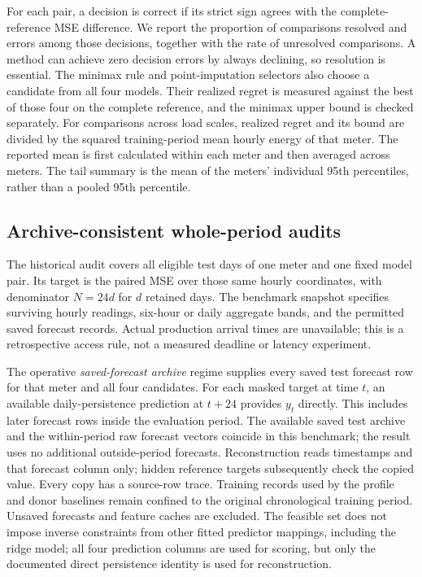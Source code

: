 \documentclass[12pt]{article}
\begin{document}
For each pair, a decision is correct if its strict sign agrees with the
complete-reference MSE difference. We report the proportion of comparisons
resolved and errors among those decisions, together with the rate of
unresolved comparisons. A method can achieve zero decision errors by
always declining, so resolution is essential. The minimax rule and
point-imputation selectors also choose a candidate from all four models.
Their realized regret is measured against the best of those four on the
complete reference, and the minimax upper bound is checked separately.
For comparisons across load scales, realized regret and its bound are
divided by the squared training-period mean hourly energy of that meter.
The reported mean is first calculated within each meter and then averaged
across meters. The tail summary is the mean of the meters' individual
95th percentiles, rather than a pooled 95th percentile.

\subsection{Archive-consistent whole-period audits}\label{sec:period-information}
The historical audit covers all eligible test days of one meter and one
fixed model pair. Its target is the paired MSE over those same hourly
coordinates, with denominator $N=24d$ for $d$ retained days. The benchmark
snapshot specifies surviving hourly readings, six-hour or daily aggregate
bands, and the permitted saved forecast records. Actual production arrival
times are unavailable; this is a retrospective access rule, not a measured
deadline or latency experiment.

The operative \emph{saved-forecast archive} regime supplies every saved
test forecast row for that meter and all four candidates. For each masked
target at time $t$, an available daily-persistence prediction at $t+24$
provides $y_t$ directly. This includes later forecast rows inside the
evaluation period. The available saved test archive and the within-period
raw forecast vectors coincide in this benchmark; the result uses no
additional outside-period forecasts. Reconstruction reads timestamps and that forecast
column only; hidden reference targets subsequently check the copied value.
Every copy has a source-row trace. Training records used by the profile
and donor baselines remain confined to the original chronological training
period. Unsaved forecasts and feature caches are excluded. The feasible set
does not impose inverse constraints from other fitted predictor mappings,
including the ridge model; all four prediction columns are used for scoring,
but only the documented direct persistence identity is used for reconstruction.
\end{document}
